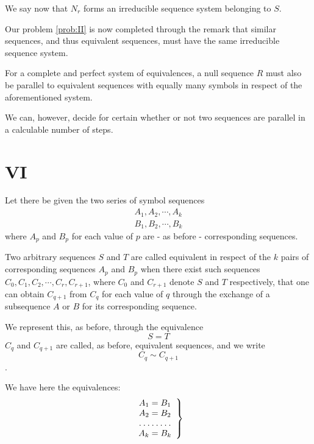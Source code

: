 We say now that $N_r$ forms an irreducible sequence system belonging
to $S$.

Our problem \ref{prob:II} is now completed through the remark that similar
sequences, and thus equivalent sequences, must have the same irreducible
sequence system.

For a complete and perfect system of equivalences, a null sequence  $R$
must also be parallel to equivalent sequences with equally many symbols
in respect of the aforementioned system.


We can, however, decide for certain whether or not two sequences are
parallel in a calculable number of steps.


\section{VI}

Let there be given the two series of symbol sequences 
\begin{gather*}
A_1, A_2, \cdots, A_k\\
B_1, B_2, \cdots, B_k
\end{gather*}
where $A_p$ and $B_p$ for each value of $p$ are - as before -
corresponding sequences.

Two arbitrary sequences $S$ and $T$ are called equivalent in respect
of the $k$ pairs of corresponding sequences $A_p$ and $B_p$ when there
exist such sequences $C_0,C_1,C_2,\cdots,C_r,C_{r+1}$, where $C_0$ and
$C_{r+1}$ denote $S$ and $T$ respectively, that one can obtain
$C_{q+1}$ from $C_q$ for each value of $q$ through the exchange of a
subsequence $A$ or $B$ for its corresponding sequence.

We represent this, as before, through the equivalence
$$S = T$$
$C_q$ and $C_{q+1}$ are called, as before, equivalent sequences, and
we write
$$C_q \sim C_{q+1}$$.

We have here the equivalences:
\begin{equation}
\left.\begin{array}{c}
A_1 = B_1 \\
A_2 = B_2 \\
\hdotsfor{1}\\
A_k = B_k \\
\end{array}\right\}
\label{eq:two}
\end{equation}

